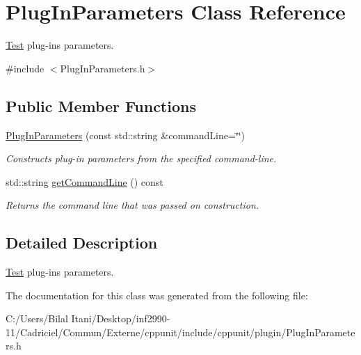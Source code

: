 \hypertarget{class_plug_in_parameters}{}\section{Plug\+In\+Parameters Class Reference}
\label{class_plug_in_parameters}


\hyperlink{class_test}{Test} plug-\/ins parameters.  




{\ttfamily \#include $<$Plug\+In\+Parameters.\+h$>$}

\subsection*{Public Member Functions}
\begin{DoxyCompactItemize}
\item 
\hyperlink{class_plug_in_parameters_acbf183c92faaa4e17dc66dec87ddc033}{Plug\+In\+Parameters} (const std\+::string \&command\+Line=\char`\"{}\char`\"{})\hypertarget{class_plug_in_parameters_acbf183c92faaa4e17dc66dec87ddc033}{}\label{class_plug_in_parameters_acbf183c92faaa4e17dc66dec87ddc033}

\begin{DoxyCompactList}\small\item\em Constructs plug-\/in parameters from the specified command-\/line. \end{DoxyCompactList}\item 
std\+::string \hyperlink{class_plug_in_parameters_aad9dfbb3f1745b72154ab6b70948d629}{get\+Command\+Line} () const \hypertarget{class_plug_in_parameters_aad9dfbb3f1745b72154ab6b70948d629}{}\label{class_plug_in_parameters_aad9dfbb3f1745b72154ab6b70948d629}

\begin{DoxyCompactList}\small\item\em Returns the command line that was passed on construction. \end{DoxyCompactList}\end{DoxyCompactItemize}


\subsection{Detailed Description}
\hyperlink{class_test}{Test} plug-\/ins parameters. 

The documentation for this class was generated from the following file\+:\begin{DoxyCompactItemize}
\item 
C\+:/\+Users/\+Bilal Itani/\+Desktop/inf2990-\/11/\+Cadriciel/\+Commun/\+Externe/cppunit/include/cppunit/plugin/Plug\+In\+Parameters.\+h\end{DoxyCompactItemize}

